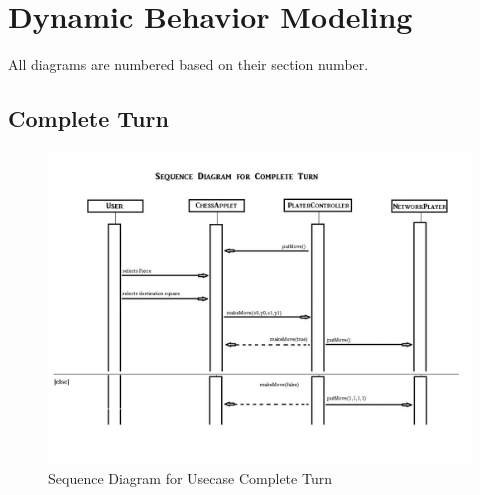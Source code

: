 \section{Dynamic Behavior Modeling}
All diagrams are numbered based on their section number.
\subsection{Complete Turn}
\begin{figure}[H]
   \centering
   \includegraphics[scale=0.50]{seq_Complete_Turn.jpg}
   \caption{Sequence Diagram for Usecase Complete Turn}
  \end{figure}
